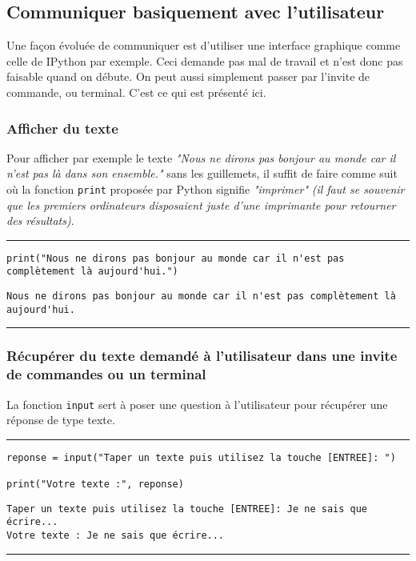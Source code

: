 \subsection{Communiquer basiquement avec l'utilisateur}

Une façon évoluée de communiquer est d'utiliser une interface graphique comme celle de IPython par exemple. Ceci demande pas mal de travail et n'est donc pas faisable quand on débute. On peut aussi simplement passer par l'invite de commande, ou terminal. C'est ce qui est présenté ici.


\subsubsection{Afficher du texte}

Pour afficher par exemple le texte \textit{"Nous ne dirons pas bonjour au monde car il n'est pas là dans son ensemble."} sans les guillemets, il suffit de faire comme suit où la fonction \texttt{print} proposée par Python signifie \textit{"imprimer"} \textit{(il faut se souvenir que les premiers ordinateurs disposaient juste d'une imprimante pour retourner des résultats)}.


\bigskip
{\hrule height .5mm}
\begin{verbatim}
print("Nous ne dirons pas bonjour au monde car il n'est pas complètement là aujourd'hui.")
\end{verbatim}
 \color{ForestGreen}
\vspace{-1.5em}
\begin{verbatim}
Nous ne dirons pas bonjour au monde car il n'est pas complètement là aujourd'hui.
\end{verbatim} \color{Black}
{\hrule height .5mm}
\bigskip


\subsubsection{Récupérer du texte demandé à l'utilisateur dans une invite de commandes ou un terminal}

La fonction \texttt{input} sert à poser une question à l'utilisateur pour récupérer une réponse de type texte.


\bigskip
{\hrule height .5mm}
\begin{verbatim}
reponse = input("Taper un texte puis utilisez la touche [ENTREE]: ")

print("Votre texte :", reponse)
\end{verbatim}
 \color{ForestGreen}
\vspace{-1.5em}
\begin{verbatim}
Taper un texte puis utilisez la touche [ENTREE]: Je ne sais que écrire...
Votre texte : Je ne sais que écrire...
\end{verbatim} \color{Black}
{\hrule height .5mm}
\bigskip
